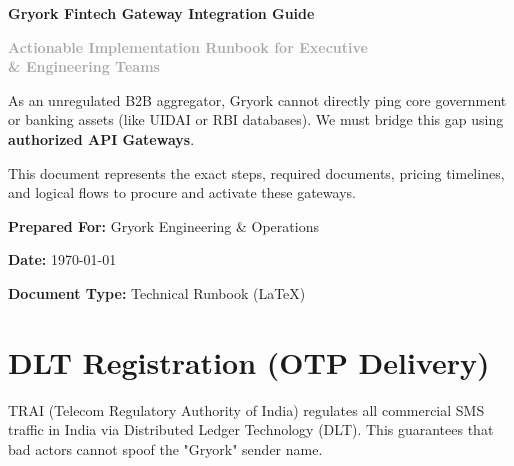 \documentclass[11pt, a4paper]{report}
\begin{document}
\begin{titlepage}
    \centering
    \vspace*{3cm}
    
    {\Huge \bfseries \textcolor{gryorkBlue}{Gryork Fintech Gateway Integration Guide} \par}
    \vspace{1cm}
    {\Large \textbf{\textcolor{darkGray}{Actionable Implementation Runbook for Executive\\ \& Engineering Teams}} \par}
    
    \vspace{4cm}
    
    \large
    As an unregulated B2B aggregator, Gryork cannot directly ping core government or banking assets (like UIDAI or RBI databases). We must bridge this gap using \textbf{authorized API Gateways}.
    
    \vspace{1em}
    This document represents the exact steps, required documents, pricing timelines, and logical flows to procure and activate these gateways.
    
    \vfill
    
    \begin{flushright}
        {\large \textbf{Prepared For:} Gryork Engineering \& Operations \par}
        {\large \textbf{Date:} \today \par}
        {\large \textbf{Document Type:} \textcolor{fintechGreen}{Technical Runbook (LaTeX)} \par}
    \end{flushright}
    
\end{titlepage}

\tableofcontents
\newpage

\chapter{DLT Registration (OTP Delivery)}

TRAI (Telecom Regulatory Authority of India) regulates all commercial SMS traffic in India via Distributed Ledger Technology (DLT). This guarantees that bad actors cannot spoof the "Gryork" sender name.
\end{document}
